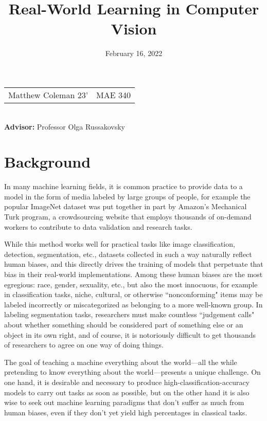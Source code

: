 \documentclass[10pt, letterpaper]{article}
\title{\vspace{-2em}
	Real-World Learning in Computer Vision
\vspace{-2em}}
\date{February 16, 2022}
\begin{document}
\maketitle
\begin{center}
	\begin{tabular}{ c c }
		Matthew Coleman 23' & MAE 340
	\end{tabular} \\
	\textbf{Advisor:} Professor Olga Russakovsky
\end{center}

\section{Background}

In many machine learning fields, it is common practice to provide data to a
model in the form of media labeled by large groups of people, for example the
popular ImageNet dataset was put together in part by Amazon's Mechanical Turk
program, a crowdsourcing website that employs thousands of on-demand workers to
contribute to data validation and research tasks. \cite{imagenet}

While this method works well for practical tasks like image classification,
detection, segmentation, etc., datasets collected in such a way naturally
reflect human biases, and this directly drives the training of models that
perpetuate that bias in their real-world implementations. \cite{olga_biases}
Among these human biases are the most egregious: race, gender, sexuality, etc.,
but also the most innocuous, for example in classification tasks, niche,
cultural, or otherwise ``nonconforming" items may be labeled incorrectly or
miscategorized as belonging to a more well-known group. In labeling
segmentation tasks, researchers must make countless ``judgement calls" about
whether something should be considered part of something else or an object in
its own right, and of course, it is notoriously difficult to get thousands of
researchers to agree on one way of doing things. \cite{labeling_disagreement}

The goal of teaching a machine everything about the world---all the while
pretending to know everything about the world---presents a unique challenge. On
one hand, it is desirable and necessary to produce high-classification-accuracy
models to carry out tasks as soon as possible, but on the other hand it is also
wise to seek out machine learning paradigms that don't suffer as much from
human biases, even if they don't yet yield high percentages in classical tasks.
\end{document}

